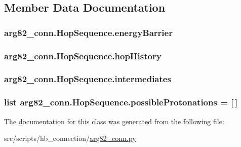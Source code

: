 \subsection{Member Data Documentation}
\hypertarget{classarg82__conn_1_1_hop_sequence_aae8e47b85c84f16fb9290a3bfe8f9d40}{
\subsubsection[{energy\-Barrier}]{\setlength{\rightskip}{0pt plus 5cm}arg82\-\_\-conn.\-Hop\-Sequence.\-energy\-Barrier}}\label{classarg82__conn_1_1_hop_sequence_aae8e47b85c84f16fb9290a3bfe8f9d40}
\hypertarget{classarg82__conn_1_1_hop_sequence_a149f553cca0c3ec0daa468c380abbf15}{
\subsubsection[{hop\-History}]{\setlength{\rightskip}{0pt plus 5cm}arg82\-\_\-conn.\-Hop\-Sequence.\-hop\-History}}\label{classarg82__conn_1_1_hop_sequence_a149f553cca0c3ec0daa468c380abbf15}
\hypertarget{classarg82__conn_1_1_hop_sequence_a7012ed813fa548f9cc38ffd6ef1c8a8f}{
\subsubsection[{intermediates}]{\setlength{\rightskip}{0pt plus 5cm}arg82\-\_\-conn.\-Hop\-Sequence.\-intermediates}}\label{classarg82__conn_1_1_hop_sequence_a7012ed813fa548f9cc38ffd6ef1c8a8f}
\hypertarget{classarg82__conn_1_1_hop_sequence_a80cca45a252f622b1b926b641f8de7d1}{
\subsubsection[{possible\-Protonations}]{\setlength{\rightskip}{0pt plus 5cm}list arg82\-\_\-conn.\-Hop\-Sequence.\-possible\-Protonations = \mbox{[}$\,$\mbox{]}\hspace{0.3cm}{\ttfamily [static]}}}\label{classarg82__conn_1_1_hop_sequence_a80cca45a252f622b1b926b641f8de7d1}


The documentation for this class was generated from the following file\-:\begin{DoxyCompactItemize}
\item 
src/scripts/hb\-\_\-connection/\hyperlink{arg82__conn_8py}{arg82\-\_\-conn.\-py}\end{DoxyCompactItemize}
